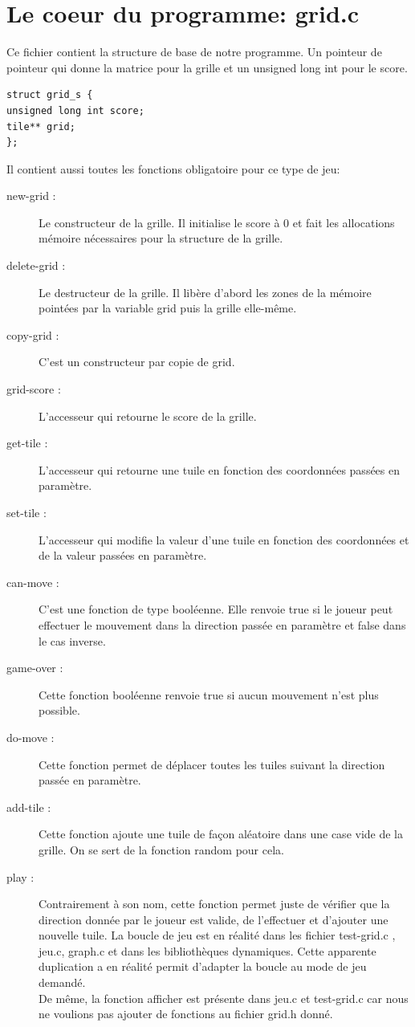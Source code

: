 \documentclass{report}
\begin{document}
\section{Le coeur du programme: grid.c}
Ce fichier contient la structure de base de notre programme. Un pointeur de pointeur qui donne la matrice pour la grille et un unsigned long int pour le score.
\begin{lstlisting}[frame=single]
struct grid_s {
unsigned long int score;
tile** grid;
};
\end{lstlisting}

Il contient aussi toutes les fonctions obligatoire pour ce type de jeu:\\

\begin{description}
\item [new-grid :] Le constructeur de la grille. Il initialise le score à 0 et fait les allocations mémoire nécessaires pour la structure de la grille.
\item [delete-grid :] Le destructeur de la grille. Il libère d'abord les zones de la mémoire pointées par la variable grid puis la grille elle-même.
\item [copy-grid :] C'est un constructeur par copie de grid.
\item [grid-score :] L'accesseur qui retourne le score de la grille.
\item [get-tile :]  L'accesseur qui retourne une tuile en fonction des coordonnées passées en paramètre.
\item [set-tile :] L'accesseur qui modifie la valeur d'une tuile en fonction des coordonnées et de la valeur passées en paramètre.
\item [can-move :] C'est une fonction de type booléenne. Elle renvoie true si le joueur peut effectuer le mouvement dans la direction passée en paramètre et false dans le cas inverse.
\item [game-over :] Cette fonction booléenne renvoie true si aucun mouvement n'est plus possible.
\item [do-move :]Cette fonction permet de déplacer toutes les tuiles suivant la direction passée en paramètre.
\item [add-tile :] Cette fonction ajoute une tuile de façon aléatoire dans une case vide de la grille. On se sert de la fonction random pour cela.
\item [play :]Contrairement à son nom, cette fonction permet juste de vérifier que la direction donnée par le joueur est valide, de l'effectuer et d'ajouter une nouvelle tuile. La boucle de jeu est en réalité dans les fichier test-grid.c , jeu.c, graph.c et dans les bibliothèques dynamiques. Cette apparente duplication a en réalité permit d'adapter la boucle au mode de jeu demandé.\\ De même, la fonction afficher est présente dans jeu.c et test-grid.c car nous ne voulions pas ajouter de fonctions au fichier grid.h donné.
\end{description}
\end{document}
